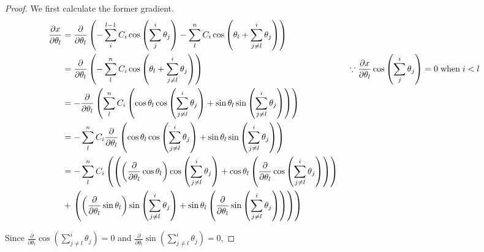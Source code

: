 \documentclass{article}
\begin{document}
\begin{proof}
  We first calculate the former gradient.
  \begin{align*}
    \frac {\partial x} {\partial \theta_l}
      &= \frac {\partial} {\partial \theta_l}
        \left(
          - \sum^{l-1}_i C_i \cos \left( \sum^i_j \theta_j \right)
          - \sum^n_l C_i \cos \left( \theta_l + \sum^i_{j \ne l} \theta_j \right)
        \right) \\
      &= \frac {\partial} {\partial \theta_l}
        \left(
          - \sum^n_l C_i \cos \left( \theta_l + \sum^i_{j \ne l} \theta_j \right)
        \right)
      && \because \frac {\partial x} {\partial \theta_l} \cos \left( \sum^i_j \theta_j \right) = 0 \thickspace \text{when} \thickspace i < l \\
      &= - \frac {\partial} {\partial \theta_l}
        \left(
          \sum^n_l C_i
            \left(
              \cos \theta_l \cos \left( \sum^i_{j \ne l} \theta_j \right) +
              \sin \theta_l \sin \left( \sum^i_{j \ne l} \theta_j \right)
            \right)
        \right) \\
      &= - \sum^n_l C_i \frac {\partial} {\partial \theta_l}
        \left(
          \cos \theta_l \cos \left( \sum^i_{j \ne l} \theta_j \right) +
          \sin \theta_l \sin \left( \sum^i_{j \ne l} \theta_j \right)
        \right) \\
      &=
      - \sum^n_l C_i
      \left(
        \left(
          \left(
            \frac {\partial} {\partial \theta_l} \cos \theta_l
          \right) \cos \left( \sum^i_{j \ne l} \theta_j \right)
          +
          \cos \theta_l
          \left(
            \frac {\partial} {\partial \theta_l}
            \cos \left( \sum^i_{j \ne l} \theta_j \right)
          \right)
        \right) \right. \\
        &+ \left.
        \left(
          \left(
            \frac {\partial} {\partial \theta_l} \sin \theta_l
          \right) \sin \left( \sum^i_{j \ne l} \theta_j \right)
          +
          \sin \theta_l
          \left(
            \frac {\partial} {\partial \theta_l}
            \sin \left( \sum^i_{j \ne l} \theta_j \right)
          \right)
        \right)
      \right)
  \end{align*}

  Since
  $\frac {\partial} {\partial \theta_l}
  \cos \left( \sum^i_{j \ne l} \theta_j \right) = 0$
  and
  $\frac {\partial} {\partial \theta_l}
  \sin \left( \sum^i_{j \ne l} \theta_j \right) = 0$,


\end{proof}
\end{document}
